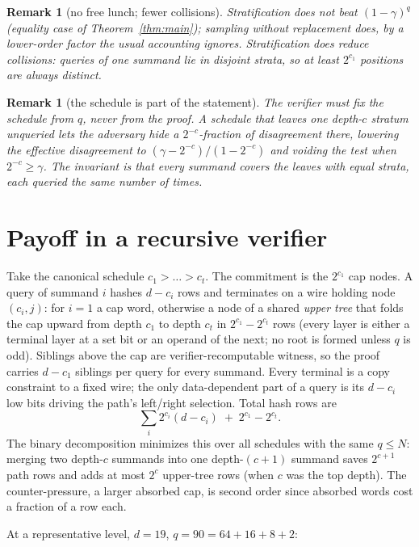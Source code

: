 \documentclass[11pt]{article}
\newcommand{\N}{N}
\newtheorem{remark}[theorem]{Remark}
\theoremstyle{definition}
\begin{document}
\begin{remark}[no free lunch; fewer collisions]
Stratification does not beat $(1-\gamma)^q$ (equality case of
Theorem~\ref{thm:main}); sampling without replacement does, by a
lower-order factor the usual accounting ignores. Stratification does
reduce collisions: queries of one summand lie in disjoint strata, so at
least $2^{c_1}$ positions are always distinct.
\end{remark}

\begin{remark}[the schedule is part of the statement]
The verifier must fix the schedule from $q$, never from the proof. A
schedule that leaves one depth-$c$ stratum unqueried lets the adversary
hide a $2^{-c}$-fraction of disagreement there, lowering the effective
disagreement to $(\gamma - 2^{-c})/(1-2^{-c})$ and voiding the test when
$2^{-c} \ge \gamma$. The invariant is that every summand covers the
leaves with equal strata, each queried the same number of times.
\end{remark}

\section{Payoff in a recursive verifier}

Take the canonical schedule $c_1 > \dots > c_t$. The commitment is the
$2^{c_1}$ cap nodes. A query of summand $i$ hashes $d - c_i$ rows and
terminates on a wire holding node $(c_i, j)$: for $i = 1$ a cap word,
otherwise a node of a shared \emph{upper tree} that folds the cap
upward from depth $c_1$ to depth $c_t$ in $2^{c_1} - 2^{c_t}$ rows
(every layer is either a terminal layer at a set bit or an operand of
the next; no root is formed unless $q$ is odd). Siblings above the cap
are verifier-recomputable witness, so the proof carries $d - c_1$
siblings per query for every summand. Every terminal is a copy
constraint to a fixed wire; the only data-dependent part of a query is
its $d - c_i$ low bits driving the path's left/right selection. Total
hash rows are
\[
\textstyle\sum_i 2^{c_i}(d - c_i) \;+\; 2^{c_1} - 2^{c_t}.
\]
The binary decomposition minimizes this over all schedules with the
same $q \le \N$: merging two depth-$c$ summands into one depth-$(c+1)$
summand saves $2^{c+1}$ path rows and adds at most $2^c$ upper-tree
rows (when $c$ was the top depth). The counter-pressure, a larger
absorbed cap, is second order since absorbed words cost a fraction of a
row each.

At a representative level, $d = 19$, $q = 90 = 64 + 16 + 8 + 2$:
\end{document}
